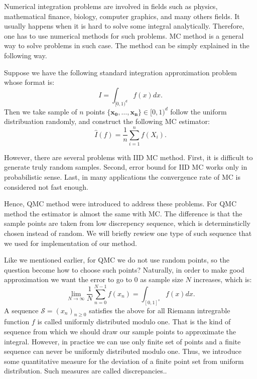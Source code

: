 
Numerical integration problems are involved in fields such as physics, mathematical finance, biology, computer graphics, and many others fields. 
It usually happens when it is hard to solve some integral analytically. Therefore, one has to use numerical methods for such problems.  
MC method is a general way to solve problems in such case\cite{fishman2013monte}. The method can be simply explained in the following way. 

Suppose we have the following standard integration approximation problem whose format is: 
\begin{equation}
    \label{eq:setup}
    I= \int_{[0,1)^d}f(x)dx.
\end{equation}
Then we take sample of $n$ points $\{\mathbf{x_0},\dots, \mathbf{x_n}\}\in [0,1)^d$ follow the uniform distribuation randomly, and construct the following MC estimator:
\[
\hat{I}(f)=\frac{1}{n}\sum_{i=1}^{n}f(X_i).
\]

However, there are several problems with IID MC method\cite{niederreiter2010quasi}.
First, it is difficult to generate truly random samples. Second, error bound for IID MC works only in probabilistic sense. 
Last, in many applications the convergence rate of MC is considered not fast enough. 

Hence, QMC method were introduced to address these problems. 
For QMC method the estimator is almost the same with MC. 
The difference is that the sample points are taken from low discrepency sequence, which is determinsticlly chosen instead of random.   
We will briefly rewiew one type of such sequence that we used for implementation of our method. 

\newpage


Like we mentioned earlier, for QMC we do not use random points, so the question become how to choose such points?  
Naturally, in order to make good approximation we want the error to go to $0$ as sample size $N$ increases, which is:
\[
    \lim_{N\to\infty}\frac{1}{N}\sum_{n=0}^{N-1}f(x_n)=\int_{[0,1]^s}f(x)dx.
\]
A sequence $\mathcal{S}=(x_n)_{n\geq0}$ satisfies the above for all Riemann intregrable function $f$ is called uniformly distributed modulo one. 
That is the kind of sequence from which we should draw our sample points to approximate the integral. 
However, in practice we can use only finite set of points and a finite sequence can never be uniformly distributed modulo one.
Thus, we introduce some quantitative measure for the deviation of a finite point set from uniform distribution. Such measures are called discrepancies.\cite{dick2010digital}.

